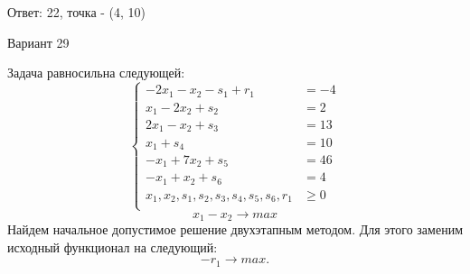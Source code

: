 \documentclass{article}%
\begin{document}
\begin{flushright}%
Ответ: 22, точка {-} (4, 10)%
\end{flushright}%
\newpage%
\begin{center}%
\begin{Huge}%
Вариант 29%
\end{Huge}%
\end{center}%
Задача равносильна следующей: %
\[%
\left\{\begin{aligned}-2x_{1}-x_{2}-s_{1}+r_{1} & =-4 \\x_{1}-2x_{2}+s_{2} & =2 \\2x_{1}-x_{2}+s_{3} & =13 \\x_{1}+s_{4} & =10 \\-x_{1}+7x_{2}+s_{5} & =46 \\-x_{1}+x_{2}+s_{6} & =4 \\x_{1},x_{2},s_{1},s_{2},s_{3},s_{4},s_{5},s_{6},r_{1} & \ge 0 \\ \end{aligned}\right.%
\]%
\[%
x_{1}-x_{2}  \to max%
\]%
Найдем начальное допустимое решение двухэтапным методом. Для этого заменим исходный функционал на следующий: %
\[%
-r_{1}\to max.%
\]%
\end{document}
